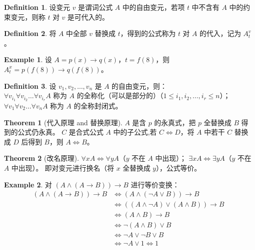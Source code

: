 \documentclass[oneside]{book}
\theoremstyle{definition}
\newtheorem{example}{Example}[section]
\newtheorem{definition}{Definition}[section]
\newtheorem{theorem}{Theorem}[section]
\begin{document}
\begin{definition}
	设变元 \( v \) 是谓词公式 \( A \) 中的自由变元，若项 \( t \) 中不含有 \( A \) 中的约束变元，则称 \( t \) 对 \( v \) 是可代入的。
\end{definition}

\begin{definition}
	将 \( A \) 中全部 \( v \) 替换成 \( t \)，得到的公式称为 \( t \) 对 \( A \) 的代入，记为 \( A_t^v \)。
\end{definition}

\begin{example}
	设 \( A = p(x) \to q(x) \)，\( t = f(8) \)，则 \( A_t^x = p(f(8)) \to q(f(8)) \)。
\end{example}

\begin{definition}
	设 \( v_1, v_2, \dots, v_n \) 是 \( A \) 的自由变元，则：\\
	 \( \forall v_{i_1} \forall v_{i_2} \dots \forall v_{i_r} A \) 称为 \( A \) 的全称化（可以是部分的）（\( 1 \leq i_1, i_2, \dots, i_r \leq n \)）；\\
	 \( \forall v_1 \forall v_2 \dots \forall v_n A \) 称为 \( A \) 的全称封闭式。
\end{definition}

\begin{theorem}[代入原理 and 替换原理]
	\( A \) 是含 \( p \) 的永真式，把 \( p \) 全替换成 \( B \) 得到的公式仍永真。
	\( C \) 是合式公式 \( A \) 中的子公式,若 \( C \Leftrightarrow D \)，将 \( A \) 中若干 \( C \) 替换成 \( D \) 后得到 \( B \)，则 \( A \Leftrightarrow B \)。
\end{theorem}

\begin{theorem}[改名原理]
	\( \forall x A \Leftrightarrow \forall y A \)（\( y \) 不在 \( A \) 中出现）；
	\( \exists x A \Leftrightarrow \exists y A \)（\( y \) 不在 \( A \) 中出现）。
	即对变元进行换名（将 \( x \) 全替换成 \( y \)），公式等价。
\end{theorem}

\begin{example}
	对 \( (A \land (A \to B)) \to B \) 进行等价变换：
	\[
	\begin{aligned}
		(A \land (A \to B)) \to B &\Leftrightarrow (A \land (\neg A \lor B)) \to B \\
		&\Leftrightarrow ((A \land \neg A) \lor (A \land B)) \to B \\
		&\Leftrightarrow (A \land B) \to B \\
		&\Leftrightarrow \neg (A \land B) \lor B \\
		&\Leftrightarrow \neg A \lor \neg B \lor B \\
		&\Leftrightarrow \neg A \lor 1 \Leftrightarrow 1
	\end{aligned}
	\]
\end{example}
\end{document}
